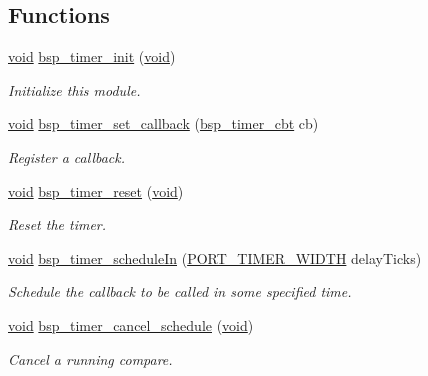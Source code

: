 \subsection*{Functions}
\begin{DoxyCompactItemize}
\item 
\hyperlink{usb__devapi_8h_afabf60e7f57651d6d595a02c75f07cd0}{void} \hyperlink{group__bsp__timer_gaffec2bf6372cf491a97821c19abad0fa}{bsp\+\_\+timer\+\_\+init} (\hyperlink{usb__devapi_8h_afabf60e7f57651d6d595a02c75f07cd0}{void})
\begin{DoxyCompactList}\small\item\em Initialize this module. \end{DoxyCompactList}\item 
\hyperlink{usb__devapi_8h_afabf60e7f57651d6d595a02c75f07cd0}{void} \hyperlink{group__bsp__timer_ga3a31a787657dccde5a1895fc87578589}{bsp\+\_\+timer\+\_\+set\+\_\+callback} (\hyperlink{openwsnmodule__obj_8h_a217f88f41d2d57897598ce4147c80419}{bsp\+\_\+timer\+\_\+cbt} cb)
\begin{DoxyCompactList}\small\item\em Register a callback. \end{DoxyCompactList}\item 
\hyperlink{usb__devapi_8h_afabf60e7f57651d6d595a02c75f07cd0}{void} \hyperlink{group__bsp__timer_ga797994251b8540f4be7628411cb98c73}{bsp\+\_\+timer\+\_\+reset} (\hyperlink{usb__devapi_8h_afabf60e7f57651d6d595a02c75f07cd0}{void})
\begin{DoxyCompactList}\small\item\em Reset the timer. \end{DoxyCompactList}\item 
\hyperlink{usb__devapi_8h_afabf60e7f57651d6d595a02c75f07cd0}{void} \hyperlink{group__bsp__timer_gac6b96b1c74c2fd8a4c307831d0fc7528}{bsp\+\_\+timer\+\_\+schedule\+In} (\hyperlink{z1_2board__info_8h_abe66b9c1c60db84f2a99f2b827275f24}{P\+O\+R\+T\+\_\+\+T\+I\+M\+E\+R\+\_\+\+W\+I\+D\+TH} delay\+Ticks)
\begin{DoxyCompactList}\small\item\em Schedule the callback to be called in some specified time. \end{DoxyCompactList}\item 
\hyperlink{usb__devapi_8h_afabf60e7f57651d6d595a02c75f07cd0}{void} \hyperlink{group__bsp__timer_ga46f9e9c7fb4f454fdc1febf216409ed6}{bsp\+\_\+timer\+\_\+cancel\+\_\+schedule} (\hyperlink{usb__devapi_8h_afabf60e7f57651d6d595a02c75f07cd0}{void})
\begin{DoxyCompactList}\small\item\em Cancel a running compare. \end{DoxyCompactList}\item 

\end{DoxyCompactItemize}
